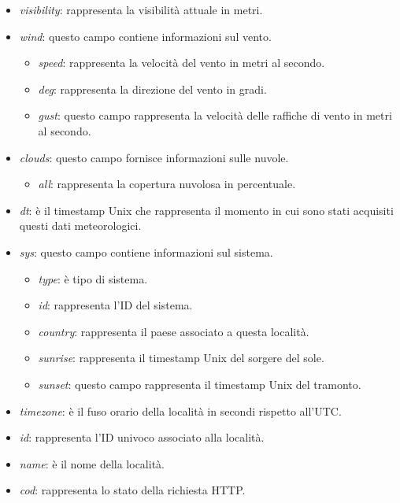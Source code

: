 \begin{itemize}
    \item \textit{visibility}: rappresenta la visibilità attuale in metri.
    \item \textit{wind}: questo campo contiene informazioni sul vento.
    \begin{itemize}
        \item \textit{speed}: rappresenta la velocità del vento in metri al secondo.
        \item \textit{deg}: rappresenta la direzione del vento in gradi.
        \item \textit{gust}: questo campo rappresenta la velocità delle raffiche di vento in metri al secondo.
    \end{itemize}
    
    \item \textit{clouds}: questo campo fornisce informazioni sulle nuvole.
    \begin{itemize}
        \item \textit{all}: rappresenta la copertura nuvolosa in percentuale.
    \end{itemize}
        
    \item \textit{dt}: è il timestamp Unix che rappresenta il momento in cui sono stati acquisiti questi dati meteorologici.
    \item \textit{sys}: questo campo contiene informazioni sul sistema.
    \begin{itemize}
        \item \textit{type}: è tipo di sistema.
        \item \textit{id}: rappresenta l'ID del sistema.
        \item \textit{country}: rappresenta il paese associato a questa località.
        \item \textit{sunrise}: rappresenta il timestamp Unix del sorgere del sole.
        \item \textit{sunset}: questo campo rappresenta il timestamp Unix del tramonto.
    \end{itemize}
        
    \item \textit{timezone}: è il fuso orario della località in secondi rispetto all'UTC. 
    \item \textit{id}: rappresenta l'ID univoco associato alla località.
    \item \textit{name}: è il nome della località.
    \item \textit{cod}: rappresenta lo stato della richiesta HTTP.
\end{itemize}

